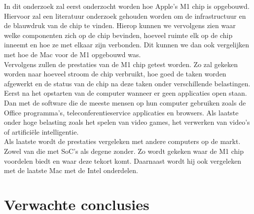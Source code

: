 \documentclass{hogent-article}
\begin{document}

In dit onderzoek zal eerst onderzocht worden hoe Apple's M1 chip is opgebouwd. Hiervoor zal een literatuur onderzoek gehouden worden om de infrastructuur en de blauwdruk van de chip te vinden. Hierop kunnen we vervolgens zien waar welke componenten zich op de chip bevinden, hoeveel ruimte elk op de chip inneemt en hoe ze met elkaar zijn verbonden. Dit kunnen we dan ook vergelijken met hoe de Mac voor de M1 opgebouwd was. \\
Vervolgens zullen de prestaties van de M1 chip getest worden. Zo zal gekeken worden naar hoeveel stroom de chip verbruikt, hoe goed de taken worden afgewerkt en de status van de chip na deze taken onder verschillende belastingen. Eerst na het opstarten van de computer wanneer er geen applicaties open staan. Dan met de software die de meeste mensen op hun computer gebruiken zoals de Office programma's,  teleconferentieservice applicaties en browsers. Als laatste onder hoge belasting zoals het spelen van video games, het verwerken van video's of artificiële intelligentie. \\
Als laatste wordt de prestaties vergeleken met andere computers op de markt. Zowel van die met SoC's als degene zonder. Zo wordt gekeken waar de M1 chip voordelen biedt en waar deze tekort komt. Daarnaast wordt hij ook vergeleken met de laatste Mac met de Intel onderdelen.

\section{Verwachte conclusies}

\end{document}

